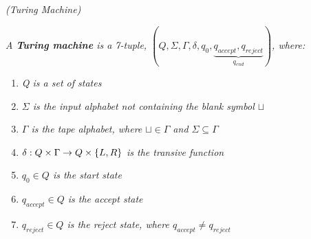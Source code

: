 \documentclass{article}
\begin{document}
\begin{defn}
    \textit{(Turing Machine)}

    \textit{A \textbf{Turing machine} is a 7-tuple, $(Q, \Sigma, \Gamma , \delta, q_0, \underbrace{q_{accept}, q_{reject}}_{q_{end}})$, where:}

    \begin{enumerate}
        \item \textit{Q is a set of states}
        \item \textit{$\Sigma$ is the input alphabet not containing the blank symbol $\sqcup $}
        \item \textit{$\Gamma$ is the tape alphabet, where $\sqcup\in \Gamma$ and $\Sigma\subseteq\Gamma$}
        \item \textit{$\delta:Q\times\Gamma\rightarrow Q\time\Gamma\times\{L,R\}$ is the transive function}
        \item \textit{$q_0\in Q$ is the start state}
        \item \textit{$q_{accept}\in Q$ is the accept state}
        \item \textit{$q_{reject}\in Q$ is the reject state, where $q_{accept}\neq q_{reject}$}
    \end{enumerate}
\end{defn}
\end{document}
